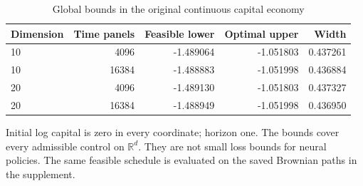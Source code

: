 \begin{table}[htbp]
\centering\small\setlength{\tabcolsep}{4pt}
\caption{Global bounds in the original continuous capital economy}\label{tab:r9capital}
\begin{tabular}{lrrrr}
\toprule
Dimension & Time panels & Feasible lower & Optimal upper & Width \\
\midrule
10 & 4096 & -1.489064 & -1.051803 & 0.437261 \\
10 & 16384 & -1.488883 & -1.051998 & 0.436884 \\
20 & 4096 & -1.489130 & -1.051803 & 0.437327 \\
20 & 16384 & -1.488949 & -1.051998 & 0.436950 \\
\bottomrule
\end{tabular}
\par\vspace{3pt}\begin{minipage}{0.97\linewidth}\footnotesize Initial log capital is zero in every coordinate; horizon one. The bounds cover every admissible control on $\mathbb R^d$. They are not small loss bounds for neural policies. The same feasible schedule is evaluated on the saved Brownian paths in the supplement.\end{minipage}
\end{table}
